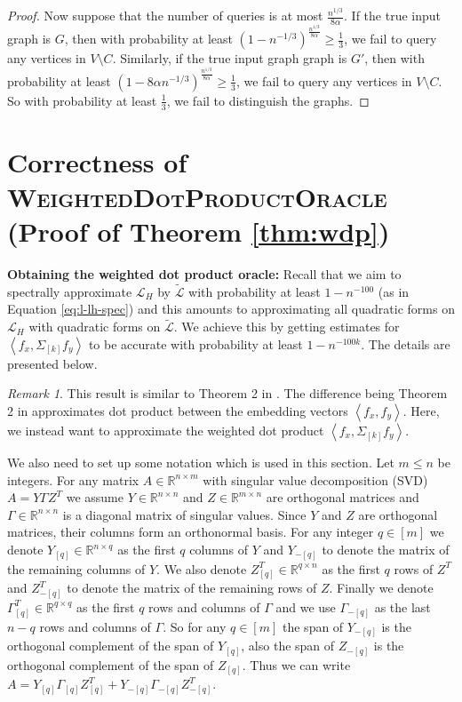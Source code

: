 \documentclass[letterpaper,11pt]{article}
\newcommand{\cL}{\mathcal{L}}
\newcommand{\R}{\mathbb{R}}
\theoremstyle{plain}
\theoremstyle{definition}
\theoremstyle{remark}
\newtheorem{remark}[theorem]{Remark}
\newcommand{\rdp}[1]
  {\ensuremath{\left\langle #1 \right\rangle}}
\newcommand{\wt}[1]{\widetilde{#1}}
\begin{document}
\begin{proof}
  Now suppose that the number of queries is at most $\frac{n^{1/3}}{8 \alpha}$. If the true input graph is $G$, then with probability at least $(1-n^{-1/3})^{\frac{n^{1/3}}{8 \alpha}} \geq \frac{1}{3}$, we fail to query any vertices in $V \setminus C$. Similarly, if the true input graph graph is $G'$, then with probability at least $(1-8\alpha n^{-1/3})^{\frac{n^{1/3}}{8 \alpha}} \geq \frac{1}{3}$, we fail to query any vertices in $V \setminus C$. So with probability at least $\frac{1}{3}$, we fail to distinguish the graphs. 
\end{proof}
 \section{Correctness of \textsc{WeightedDotProductOracle} (Proof of Theorem \ref{thm:wdp})}
\label{sec:wdp:oracle}

{\bf Obtaining the weighted dot product oracle:} 
Recall that we aim to spectrally approximate
$\cL_H$ by $\wt{\cL}$ with probability at least $1-n^{-100}$ (as in Equation \eqref{eq:l-lh-spec}) and this amounts to approximating all quadratic
forms on $\cL_H$ with quadratic forms on $\wt{\cL}$. We achieve this by getting  estimates for $\rdp{f_x, \Sigma_{[k]} f_y}$ to be accurate with probability at
least $1 - n^{-100k}$. The details are presented below. 


\thmweighteddot*

\begin{remark} \label{rem:eta:in:runningtime}
	This result is similar to Theorem 2 in \cite{GluchKLMS21}. The difference being Theorem 2 in 
	\cite{GluchKLMS21} approximates dot product between the embedding vectors $\rdp{f_x, f_y}$. 
	Here, we instead want to approximate the weighted dot product $\rdp{f_x, \Sigma_{[k]} f_y}$.
\end{remark}



We also need to set up some notation which is used in this section. Let $m\leq n$ be integers.  
For any matrix $A\in \R^{n\times m}$ with singular value decomposition (SVD) 
$A=Y\Gamma Z^T$ we assume $Y\in \R^{n\times n}$ and $Z\in \R^{m\times n}$ are orthogonal 
matrices and  $\Gamma \in \R^{n\times n}$ is a diagonal matrix of singular values. Since 
$Y$ and $Z$ are orthogonal matrices, their columns form an orthonormal basis. For any 
integer $q\in[m]$ we denote $Y_{[q]}\in \R^{n \times q}$ as the first $q$ columns of $Y$ 
and $Y_{-[q]}$ to denote the matrix of the remaining columns of $Y$.  We also denote 
$Z^T_{[q]}\in \R^{q \times n}$ as the first $q$ rows of $Z^T$ and $Z^T_{-[q]}$ to denote 
the matrix of the remaining rows of $Z$. Finally we denote $\Gamma^T_{[q]}\in \R^{q \times q}$ 
as the first $q$ rows and columns of $\Gamma$ and we use $\Gamma_{-[q]}$ as the last $n-q$ 
rows and columns of $\Gamma$. So for any $q\in[m]$ the span of $Y_{-[q]}$ is the orthogonal 
complement of the span of $Y_{[q]}$, also the span of $Z_{-[q]}$ is the orthogonal 
complement of the span of $Z_{[q]}$. Thus we can write 
$A=Y_{[q]}\Gamma_{[q]}Z^T_{[q]} + Y_{-[q]}\Gamma_{-[q]}Z^T_{-[q]}$.
\end{document}
